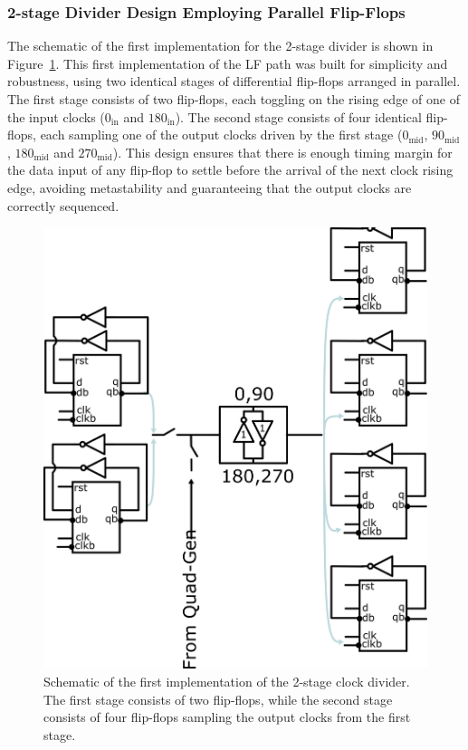 \subsubsection{2-stage Divider Design Employing Parallel Flip-Flops}
The schematic of the first implementation for the 2-stage divider is shown in Figure~\ref{fig:2stage_divider}.
This first implementation of the LF path was built for simplicity and robustness, using two identical stages of differential flip-flops arranged in parallel. The first stage consists of two flip-flops, each toggling on the rising edge of one of the input clocks (\(0_{\text{in}}\) and \({180}_{\text{in}}\)). The second stage consists of four identical flip-flops, each sampling one of the output clocks driven by the first stage (\(0_{\text{mid}}\), \(90_{\text{mid}}\), \(180_{\text{mid}}\) and \(270_{\text{mid}}\)). This design ensures that there is enough timing margin for the data input of any flip-flop to settle before the arrival of the next clock rising edge, avoiding metastability and guaranteeing that the output clocks are correctly sequenced. 

\begin{figure}[H]
  \centering
  \includegraphics[width=0.8\linewidth]{figures/Schematics/2stage_divider.png}
  \caption{Schematic of the first implementation of the 2-stage clock divider. The first stage consists of two flip-flops, while the second stage consists of four flip-flops sampling the output clocks from the first stage.}
  \label{fig:2stage_divider}
\end{figure}


